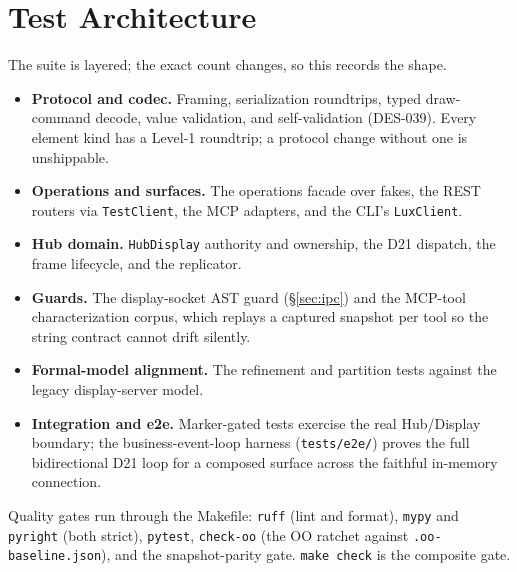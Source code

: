 \documentclass[a4paper,10pt]{article}
\begin{document}
\section{Test Architecture}

The suite is layered; the exact count changes, so this records the shape.

\begin{itemize}
  \item \textbf{Protocol and codec.}  Framing, serialization roundtrips,
    typed draw-command decode, value validation, and self-validation
    (DES-039).  Every element kind has a Level-1 roundtrip; a protocol
    change without one is unshippable.
  \item \textbf{Operations and surfaces.}  The operations facade over
    fakes, the REST routers via \texttt{TestClient}, the MCP adapters, and
    the CLI's \texttt{LuxClient}.
  \item \textbf{Hub domain.}  \texttt{HubDisplay} authority and ownership,
    the D21 dispatch, the frame lifecycle, and the replicator.
  \item \textbf{Guards.}  The display-socket AST guard
    (\S\ref{sec:ipc}) and the MCP-tool characterization corpus, which
    replays a captured snapshot per tool so the string contract cannot
    drift silently.
  \item \textbf{Formal-model alignment.}  The refinement and partition
    tests against the legacy display-server model.
  \item \textbf{Integration and e2e.}  Marker-gated tests exercise the real
    Hub/Display boundary; the business-event-loop harness
    (\texttt{tests/e2e/}) proves the full bidirectional D21 loop for a
    composed surface across the faithful in-memory connection.
\end{itemize}

Quality gates run through the Makefile: \texttt{ruff} (lint and format),
\texttt{mypy} and \texttt{pyright} (both strict), \texttt{pytest},
\texttt{check-oo} (the OO ratchet against \texttt{.oo-baseline.json}), and
the snapshot-parity gate.  \texttt{make check} is the composite gate.
\end{document}
